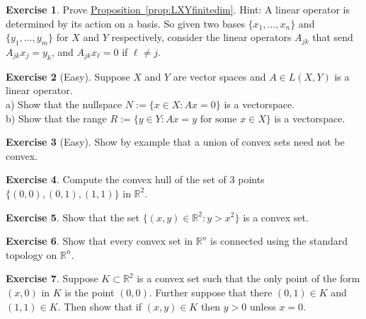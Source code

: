 \documentclass[12pt]{book}
\newcommand{\R}{{\mathbb{R}}}
\newcommand{\sectionnewpage}{\clearpage}
\theoremstyle{plain}
\theoremstyle{remark}
\theoremstyle{definition}
\theoremstyle{exercise}
\newtheorem{exercise}{Exercise}[section]
\theoremstyle{example}
\newcommand{\propref}[1]{\hyperref[#1]{Proposition~\ref*{#1}}}
\begin{document}
\begin{exercise}
Prove \propref{prop:LXYfinitedim}.  Hint: A linear operator is determined by
its action on a basis.  So given two bases
$\{ x_1,\ldots,x_n \}$ and
$\{ y_1,\ldots,y_m \}$ for $X$ and $Y$ respectively, consider the linear
operators $A_{jk}$ that send $A_{jk} x_j = y_k$, and 
$A_{jk} x_\ell = 0$ if $\ell \not= j$.
\end{exercise}

\begin{exercise}[Easy]
Suppose $X$ and $Y$ are vector spaces and $A \in L(X,Y)$ is a linear
operator.\\
a) Show that the nullspace $N := \{ x \in X : Ax = 0 \}$ is a
vectorspace.
\\
b) Show that the range $R := \{ y \in Y : Ax = y \text{ for some $x \in X$} \}$ is a
vectorspace.
\end{exercise}

\begin{exercise}[Easy]
Show by example that a union of convex sets need not be convex.
\end{exercise}

\begin{exercise}
Compute the convex hull of the set of 3 points $\{ (0,0), (0,1), (1,1) \}$ in
$\R^2$.
\end{exercise}

\begin{exercise}
Show that the set $\{ (x,y) \in \R^2 : y > x^2 \}$ is a convex set.
\end{exercise}

\begin{exercise}
Show that every convex set in $\R^n$ is connected using the standard
topology on $\R^n$.
\end{exercise}

\begin{exercise}
Suppose $K \subset \R^2$ is a convex set such that the only point of
the form $(x,0)$ in $K$ is the point $(0,0)$.  Further suppose that
there $(0,1) \in K$ and $(1,1) \in K$.  Then show that if $(x,y) \in K$
then $y > 0$ unless $x=0$.
\end{exercise}



\sectionnewpage
\end{document}
